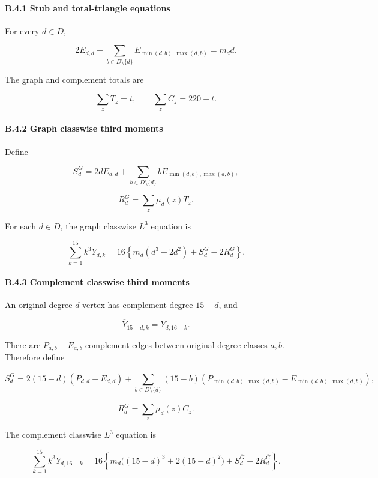 \documentclass[
  english,
  11pt,
  a4paper,
]{article}
\begin{document}
\paragraph{B.4.1 Stub and total-triangle
equations}\label{b.4.1-stub-and-total-triangle-equations}

For every \(d\in D\),

\[
2E_{d,d}+\sum_{b\in D\setminus\{d\}}
E_{\min(d,b),\max(d,b)}=m_dd.
\tag{B.27}
\]

The graph and complement totals are

\[
\sum_zT_z=t,\qquad
\sum_zC_z=220-t.
\tag{B.28}
\]

\paragraph{B.4.2 Graph classwise third
moments}\label{b.4.2-graph-classwise-third-moments}

Define

\[
S_d^G=2dE_{d,d}
+\sum_{b\in D\setminus\{d\}}
bE_{\min(d,b),\max(d,b)},
\tag{B.29}
\]

\[
R_d^G=\sum_z\mu_d(z)T_z.
\tag{B.30}
\]

For each \(d\in D\), the graph classwise \(L^3\) equation is

\[
\sum_{k=1}^{15}k^3Y_{d,k}
=16\left\{m_d(d^3+2d^2)+S_d^G-2R_d^G\right\}.
\tag{B.31}
\]

\paragraph{B.4.3 Complement classwise third
moments}\label{b.4.3-complement-classwise-third-moments}

An original degree-\(d\) vertex has complement degree \(15-d\), and

\[
\overline Y_{15-d,k}=Y_{d,16-k}.
\tag{B.32}
\]

There are \(P_{a,b}-E_{a,b}\) complement edges between original degree
classes \(a,b\). Therefore define

\[
S_d^{\overline G}
=2(15-d)(P_{d,d}-E_{d,d})
+\sum_{b\in D\setminus\{d\}}
(15-b)\left(
P_{\min(d,b),\max(d,b)}
-E_{\min(d,b),\max(d,b)}
\right),
\tag{B.33}
\]

\[
R_d^{\overline G}=\sum_z\mu_d(z)C_z.
\tag{B.34}
\]

The complement classwise \(L^3\) equation is

\[
\sum_{k=1}^{15}k^3Y_{d,16-k}
=16\left\{
m_d\bigl((15-d)^3+2(15-d)^2\bigr)
+S_d^{\overline G}-2R_d^{\overline G}
\right\}.
\tag{B.35}
\]
\end{document}
